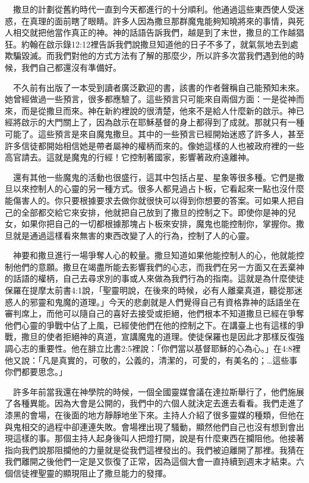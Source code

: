 \documentclass{book}
\begin{document}
　撒旦的計劃從舊約時代一直到今天都進行的十分順利。他通過這些東西使人受迷惑，在真理的面前瞎了眼睛。許多人因為撒旦那群魔鬼能夠知曉將來的事情，與死人相交就把他當作真正的神。神的話語告訴我們，越是到了末世，撒旦的工作越猖狂。約翰在啟示錄12:12裡告訴我們說撒旦知道他的日子不多了，就氣氛地去到處欺騙毀滅。而我們對他的方式方法有了解的那麼少，所以許多次當我們遇到他的時候，我們自己都還沒有準備好。

　不久前有出版了一本受到讀者廣泛歡迎的書，該書的作者聲稱自己能預知未來。她曾經做過一些預言，很多都應驗了。這些預言只可能來自兩個方面：一是從神而來，而是從撒旦而來。神在新約裡說的很清楚，他來不是給人什麼新的啟示。神已經將啟示的大門關上了，因為啟示在耶穌基督的身上都得到了成就。那就只有一種可能了。這些預言是來自魔鬼撒旦。其中的一些預言已經開始迷惑了許多人，甚至許多信徒都開始相信她是帶者屬神的權柄而來的。像她這樣的人也被政府裡的一些高官請去。這就是魔鬼的行經！它控制著國家，影響著政府遠離神。

　還有其他一些魔鬼的活動也很盛行，這其中包括占星、星象等很多種。它們是撒旦以來控制人的心靈的另一種方式。很多人都見過占卜板，它看起來一點也沒什麼能傷害人的。你只要根據要求去做你就很快可以得到你想要的答案。可如果人把自己的全部都交給它來安排，他就把自己放到了撒旦的控制之下。即使你是神的兒女，如果你把自己的一切都根據那塊占卜板來安排，魔鬼也能控制你，掌握你。撒旦就是通過這樣看來無害的東西改變了人的行為，控制了人的心靈。

　神要和撒旦進行一場爭奪人心的較量。撒旦知道如果他能控制人的心，他就能控制他們的意願。撒旦在竭盡所能去影響我們的心志，而我們在另一方面又在丟棄神的話語的權柄，自己去尋求別的事或人來做為我們行為的指南。這就是為什麼使徒保羅在提摩太前書4:1說，「聖靈明說，在後來的時候，必有人離棄真道，聽從那迷惑人的邪靈和鬼魔的道理。」今天的悲劇就是人們覺得自己有資格靠神的話語坐在審判席上，而他可以隨自己的喜好去接受或拒絕，他們根本不知道撒旦已經在爭奪他們心靈的爭戰中佔了上風，已經使他們在他的控制之下。在講臺上也有這樣的爭戰，撒旦的使者拒絕神的真道，宣講魔鬼的道理。使徒保羅也是因此才那樣反復強調心志的重要性。他在腓立比書2:5裡說：「你們當以基督耶穌的心為心。」在4:8裡他又說：「凡是真實的，可敬的，公義的，清潔的，可愛的，有美名的；…這些事你們都要思念。」

　許多年前當我還在神學院的時候，一個全國靈媒會議在達拉斯舉行了，他們施展了各種異能。因為大會是公開的，我們中的六個人就決定去進去看看。我們走進了漆黑的會場，在後面的地方靜靜地坐下來。主持人介紹了很多靈媒的種類，但他在與鬼相交的過程中卻連連失敗。會場裡出現了騷動，顯然他們自己也沒有想到會出現這樣的事。那個主持人起身後叫人把燈打開，說是有什麼東西在攔阻他。他接著指向我們說那阻攔他的力量就是從我們這裡發出的。我們被迫離開了那裡。我猜在我們離開之後他們一定是又恢復了正常，因為這個大會一直持續到週末才結束。六個信徒裡聖靈的顯現阻止了撒旦能力的發揮。
\end{document}
